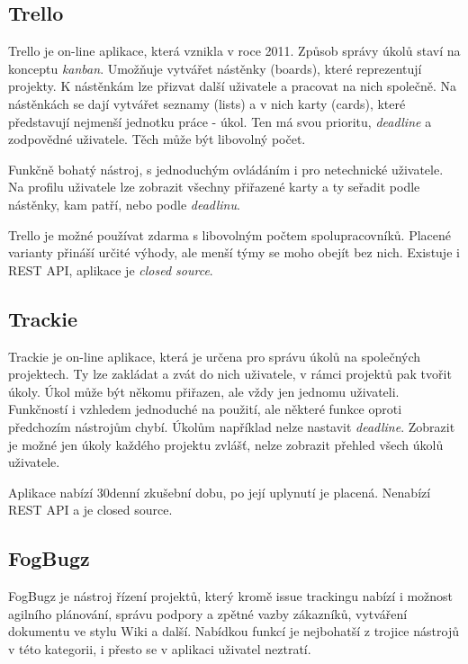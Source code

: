 \documentclass[thesis=B,czech]{FITthesis}[2012/06/26]
\begin{document}
		\subsection{Trello}
			Trello \cite{trello} je on-line aplikace, která vznikla v roce 2011. Způsob správy úkolů staví na konceptu \textit{kanban}\cite{kanban}. Umožňuje vytvářet nástěnky (boards), které reprezentují projekty. K nástěnkám lze přizvat další uživatele a pracovat na nich společně. Na nástěnkách se dají vytvářet seznamy (lists) a v nich karty (cards), které představují nejmenší jednotku práce - úkol. Ten má svou prioritu, \textit{deadline} a zodpovědné uživatele. Těch může být libovolný počet.
			
			Funkčně bohatý nástroj, s jednoduchým ovládáním i pro netechnické uživatele. Na profilu uživatele lze zobrazit všechny přiřazené karty a ty seřadit podle nástěnky, kam patří, nebo podle \textit{deadlinu}. 
			
			Trello je možné používat zdarma s libovolným počtem spolupracovníků. Placené varianty přináší určité výhody\cite{trello-pricing}, ale menší týmy se moho obejít bez nich. Existuje i REST API\cite{trello-api}, aplikace je \textit{closed source}.
		
			
		\subsection{Trackie}
			Trackie \cite{trackie} je on-line aplikace, která je určena pro správu úkolů na společných projektech. Ty lze zakládat a zvát do nich uživatele, v rámci projektů pak tvořit úkoly. Úkol může být někomu přiřazen, ale vždy jen jednomu uživateli. Funkčností i vzhledem jednoduché na použití, ale některé funkce oproti předchozím nástrojům chybí. Úkolům například nelze nastavit \textit{deadline}. Zobrazit je možné jen úkoly každého projektu zvlášť, nelze zobrazit přehled všech úkolů uživatele. 
			
			Aplikace nabízí 30denní zkušební dobu, po její uplynutí je placená. Nenabízí REST API a je closed source.
			
		\subsection{FogBugz}
			FogBugz \cite{fogbugz} je nástroj řízení projektů, který kromě issue trackingu nabízí i možnost agilního plánování\cite{agile-planning}, správu podpory a zpětné vazby zákazníků, vytváření dokumentu ve stylu Wiki a další. Nabídkou funkcí je nejbohatší z trojice nástrojů v této kategorii, i přesto se v aplikaci uživatel neztratí. 
			
\end{document}

